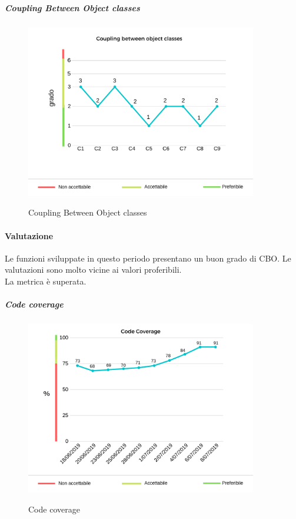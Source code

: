 	\pagebreak
	\subparagraph{Coupling Between Object classes}
	\begin{center}
		\begin{figure}[h] 
			\centering 
			\includegraphics[width=0.90\textwidth]{res/images/new/cbo.png}\\
			\caption{Coupling Between Object classes}
		\end{figure}
	\end{center}
	\paragraph*{Valutazione} Le funzioni sviluppate in questo periodo presentano un buon grado di CBO. Le valutazioni sono molto vicine ai valori proferibili. \\ 
	La metrica è superata. 
	\pagebreak
	\subparagraph{Code coverage}
	\begin{center}
		\begin{figure}[h] 
			\centering 
			\includegraphics[width=0.90\textwidth]{res/images/new/codecov.png}\\
			\caption{Code coverage}
		\end{figure}
	\end{center}
